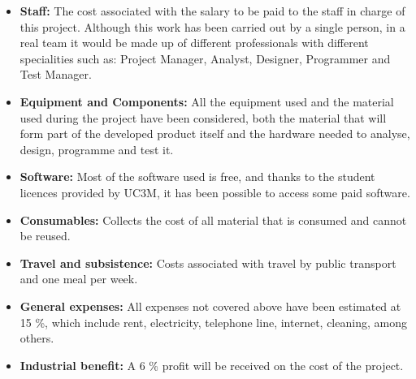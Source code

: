 \begin{itemize}
	\item \textbf{Staff:} The cost associated with the salary to be paid to the staff in charge of this project. Although this work has been carried out by a single person, in a real team it would be made up of different professionals with different specialities such as: Project Manager, Analyst, Designer, Programmer and Test Manager.
	\item \textbf{Equipment and Components:} All the equipment used and the material used during the project have been considered, both the material that will form part of the developed product itself and the hardware needed to analyse, design, programme and test it.
	\item \textbf{Software:} Most of the software used is free, and thanks to the student licences provided by UC3M, it has been possible to access some paid software.
	\item \textbf{Consumables:} Collects the cost of all material that is consumed and cannot be reused.
	\item \textbf{Travel and subsistence:} Costs associated with travel by public transport and one meal per week.
	\item \textbf{General expenses:} All expenses not covered above have been estimated at 15 \%, which include rent, electricity, telephone line, internet, cleaning, among others.
	\item \textbf{Industrial benefit:} A 6 \% profit will be received on the cost of the project.
\end{itemize}

